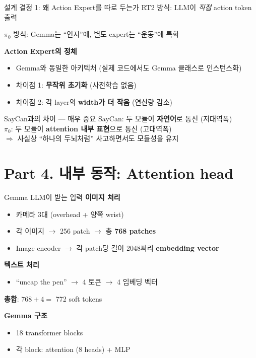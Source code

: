 \documentclass[aspectratio=169,10pt]{beamer}
\begin{document}
\begin{frame}{설계 결정 1: 왜 Action Expert를 따로 두는가}
RT2 방식: LLM이 \emph{직접} action token 출력

\vspace{0.4em}
$\pi_0$ 방식: Gemma는 ``인지''에, 별도 expert는 ``운동''에 특화

\vspace{0.8em}
\textbf{Action Expert의 정체}
\begin{itemize}
  \item Gemma와 \alert{동일한 아키텍처} (실제 코드에서도 Gemma 클래스로 인스턴스화)
  \item 차이점 1: \textbf{무작위 초기화} (사전학습 없음)
  \item 차이점 2: 각 layer의 \textbf{width가 더 작음} (연산량 감소)
\end{itemize}

\vspace{0.8em}
\begin{block}{SayCan과의 차이 --- 매우 중요}
SayCan: 두 모듈이 \textbf{자연어}로 통신 (저대역폭)\\
$\pi_0$: 두 모듈이 \textbf{attention 내부 표현}으로 통신 (고대역폭)\\
$\Rightarrow$ 사실상 ``하나의 두뇌처럼'' 사고하면서도 모듈성을 유지
\end{block}
\end{frame}

\section{Part 4. 내부 동작: Attention head}

\begin{frame}{Gemma LLM이 받는 입력}
\textbf{이미지 처리}
\begin{itemize}
  \item 카메라 3대 (overhead + 양쪽 wrist)
  \item 각 이미지 $\to$ 256 patch $\to$ 총 \textbf{768 patches}
  \item Image encoder $\to$ 각 patch당 길이 2048짜리 \textbf{embedding vector}
\end{itemize}

\vspace{0.5em}
\textbf{텍스트 처리}
\begin{itemize}
  \item ``uncap the pen'' $\to$ 4 토큰 $\to$ 4 임베딩 벡터
\end{itemize}

\vspace{0.5em}
\textbf{총합}: $768 + 4 = $ \alert{772 soft tokens}

\vspace{0.8em}
\textbf{Gemma 구조}
\begin{itemize}
  \item 18 transformer blocks
  \item 각 block: attention (8 heads) + MLP
\end{itemize}
\end{frame}
\end{document}
